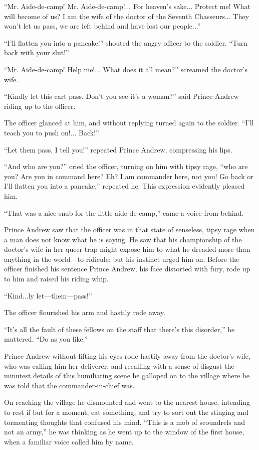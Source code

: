 ``Mr. Aide-de-camp! Mr. Aide-de-camp!... For heaven's
sake... Protect me!  What will become of us? I am the wife of the
doctor of the Seventh Chasseurs... They won't let us pass, we are
left behind and have lost our people...''

``I'll flatten you into a pancake!'' shouted the angry officer to
the soldier. ``Turn back with your slut!''

``Mr. Aide-de-camp! Help me!... What does it all mean?'' screamed
the doctor's wife.

``Kindly let this cart pass. Don't you see it's a woman?'' said
Prince Andrew riding up to the officer.

The officer glanced at him, and without replying turned again to
the soldier. ``I'll teach you to push on!... Back!''

``Let them pass, I tell you!'' repeated Prince Andrew,
compressing his lips.

``And who are you?'' cried the officer, turning on him with tipsy
rage, ``who are you? Are you in command here? Eh? I am commander
here, not you!  Go back or I'll flatten you into a pancake,''
repeated he. This expression evidently pleased him.

``That was a nice snub for the little aide-de-camp,'' came a
voice from behind.

Prince Andrew saw that the officer was in that state of
senseless, tipsy rage when a man does not know what he is
saying. He saw that his championship of the doctor's wife in her
queer trap might expose him to what he dreaded more than anything
in the world---to ridicule; but his instinct urged him on. Before
the officer finished his sentence Prince Andrew, his face
distorted with fury, rode up to him and raised his riding whip.

``Kind...ly let---them---pass!''

The officer flourished his arm and hastily rode away.

``It's all the fault of these fellows on the staff that there's
this disorder,'' he muttered. ``Do as you like.''

Prince Andrew without lifting his eyes rode hastily away from the
doctor's wife, who was calling him her deliverer, and recalling
with a sense of disgust the minutest details of this humiliating
scene he galloped on to the village where he was told that the
commander-in-chief was.

On reaching the village he dismounted and went to the nearest
house, intending to rest if but for a moment, eat something, and
try to sort out the stinging and tormenting thoughts that
confused his mind. ``This is a mob of scoundrels and not an
army,'' he was thinking as he went up to the window of the first
house, when a familiar voice called him by name.

